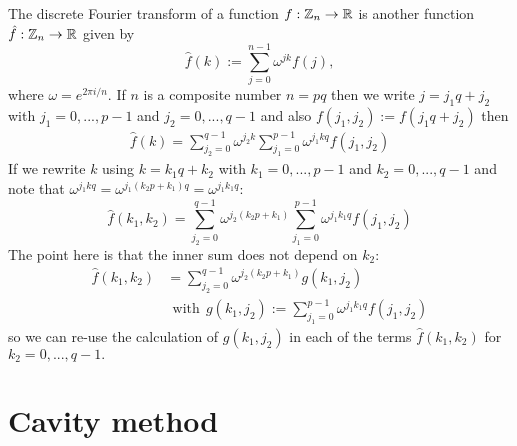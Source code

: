 \documentclass[11pt]{article}
\begin{document}
The discrete Fourier transform of a function $f:\mathbb Z_n\to \mathbb R$
is another function $\hat{f}:\mathbb Z_n\to \mathbb R$ given by
$$
    \hat{f}(k) := \sum_{j=0}^{n-1} \omega^{jk}f(j),%
$$
where $\omega=e^{2\pi i/n}.$
If $n$ is a composite number $n=pq$ then we
write $j=j_1 q + j_2$ with $j_1 = 0,...,p-1$ and $j_2 = 0,...,q-1$
and also $f(j_1, j_2):=f(j_1 q + j_2)$
then
\begin{align*}
        \hat{f}(k) = \sum_{j_2=0}^{q-1} \omega^{j_2k} \sum_{j_1=0}^{p-1} \omega^{j_1kq} f(j_1,j_2) 
\end{align*}
If we rewrite $k$ using
$k=k_1 q + k_2$ with $k_1 = 0,...,p-1$ and $k_2 = 0,...,q-1$
and note that 
$\omega^{j_1kq}=\omega^{j_1(k_2p+k_1)q}=\omega^{j_1k_1q}:$
$$
        \hat{f}(k_1, k_2) = \sum_{j_2=0}^{q-1} \omega^{j_2(k_2 p+k_1)} \sum_{j_1=0}^{p-1} \omega^{j_1k_1q} f(j_1,j_2)
$$
The point here is that the inner sum does not depend on $k_2:$
\begin{align*}
        \hat{f}(k_1, k_2) &= \sum_{j_2=0}^{q-1} \omega^{j_2(k_2 p+k_1)} g(k_1, j_2) \\
        &\ \ \mathrm{with} \ \ g(k_1,j_2) := \sum_{j_1=0}^{p-1} \omega^{j_1k_1q} f(j_1,j_2)
\end{align*}
so we can re-use the calculation of $g(k_1, j_2)$ 
in each of the terms $\hat{f}(k_1, k_2)$ for $k_2=0,...,q-1.$



%
%

\section{Cavity method}
\end{document}
